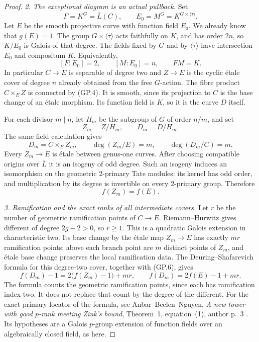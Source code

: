 \begin{proof}
\emph{2. The exceptional diagram is an actual pullback.}
Set
\[
 F=K^G=\overline L(C),\qquad
 E_0=M^G=K^{G\times\langle\tau\rangle}.
\]
Let $E$ be the smooth projective curve with function field $E_0$.
We already know that $g(E)=1$.
The group $G\times\langle\tau\rangle$ acts faithfully on $K$,
and has order $2n$, so
$K/E_0$ is Galois of that degree.  The fields fixed by
$G$ and by $\langle\tau\rangle$ have intersection $E_0$ and
compositum $K$.  Equivalently,
\[
       [F:E_0]=2,\qquad [M:E_0]=n,\qquad FM=K.
 \tag{GP.4}
\]
In particular $C\to E$ is separable of degree two and
$Z\to E$ is the cyclic \'etale cover of degree $n$ already
obtained from the free $G$-action.
The fibre product $C\times_E Z$ is connected by (GP.4).
It is smooth, since its projection to $C$ is the base change
of an \'etale morphism.  Its function field is $K$, so it is
the curve $D$ itself.

For each divisor $m\mid n$, let $H_m$ be the subgroup of $G$
of order $n/m$, and set
\[
       Z_m=Z/H_m,\qquad D_m=D/H_m.
\]
The same field calculation gives
\[
        D_m=C\times_E Z_m,\qquad
        \deg(Z_m/E)=m,\qquad \deg(D_m/C)=m.
 \tag{GP.5}
\]
Every $Z_m\to E$ is \'etale between genus-one curves.
After choosing compatible origins over $\overline L$ it is
an isogeny of odd degree.  Such an isogeny induces an
isomorphism on the geometric $2$-primary Tate modules:
its kernel has odd order, and multiplication by its degree
is invertible on every $2$-primary group.  Therefore
\[
                              f(Z_m)=f(E).
 \tag{GP.6}
\]

\emph{3. Ramification and the exact ranks of all intermediate covers.}
Let $r$ be the number of geometric ramification points of
$C\to E$.  Riemann--Hurwitz gives different of degree
$2g-2>0$, so $r\ge1$.  This is a quadratic Galois extension
in characteristic two.  Its base change by the \'etale map
$Z_m\to E$ has exactly $mr$ ramification points: above each
branch point are $m$ distinct points of $Z_m$, and \'etale
base change preserves the local ramification data.
The Deuring--Shafarevich formula for this degree-two cover,
together with (GP.6), gives
\[
             f(D_m)-1=2\bigl(f(Z_m)-1\bigr)+mr,
 \qquad
             f(D_m)=2f(E)-1+mr.
 \tag{GP.7}
\]
The formula counts the geometric ramification points, since
each has ramification index two.  It does not replace that
count by the degree of the different.
For the exact primary locator of the formula, see
Anbar--Beelen--Nguyen,
\emph{A new tower with good $p$-rank meeting Zink's bound},
Theorem~1, equation~(1), author p.~3 \cite{AnbarBeelenNguyenP}.
Its hypotheses are a Galois $p$-group extension of function
fields over an algebraically closed field, as here.


\end{proof}
